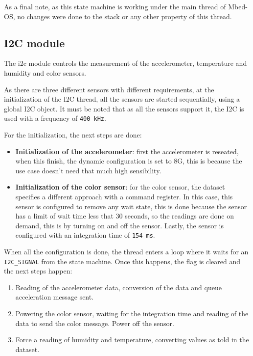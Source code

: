 As a final note, as this state machine is working under the main thread of Mbed-OS, no changes were done to the stack or any other property of this thread.

\subsection{I2C module}

The \acrshort{i2c} module controls the measurement of the accelerometer, temperature and humidity and color sensors.

As there are three different sensors with different requirements, at the initialization of the I2C thread, all the sensors are started sequentially, using a global I2C object. It must be noted that as all the sensors 
support it, the I2C is used with a frequency of \texttt{400 kHz}.

For the initialization, the next steps are done:
\begin{itemize}
    \item \textbf{Initialization of the accelerometer}: first the accelerometer is reseated, when this finish, the dynamic configuration is set to 8G, this is because the use case doesn't need that much high sensibility.
    \item \textbf{Initialization of the color sensor}: for the color sensor, the dataset specifies a different approach with a command register. In this case, this sensor is configured to remove any wait state, this is done because 
    the sensor has a limit of wait time less that 30 seconds, so the readings are done on demand, this is by turning on and off the sensor. Lastly, the sensor is configured with an integration time of \texttt{154 ms}.
\end{itemize}

When all the configuration is done, the thread enters a loop where it waits for an \texttt{I2C\_SIGNAL} from the state machine. Once this happens, the flag is cleared and the next steps happen:
\begin{enumerate}
    \item Reading of the accelerometer data, conversion of the data and queue acceleration message sent.
    \item Powering the color sensor, waiting for the integration time and reading of the data to send the color message. Power off the sensor.
    \item Force a reading of humidity and temperature, converting values as told in the dataset\cite{Support_Documents_TechnicalDocs_Si7021A20}.
\end{enumerate}

